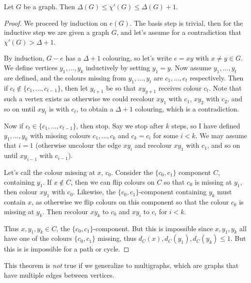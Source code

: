 \documentclass[a4paper]{scrartcl}
\begin{document}
\begin{theorem}
	Let $G$ be a graph. Then $\Delta(G) \leq \chi'(G) \leq \Delta(G) + 1$.
\end{theorem}
\begin{proof}
	We proceed by induction on $e(G)$. The basis step is trivial, then for the inductive step we are given a graph $G$, and let's assume for a contradiction that $\chi'(G) > \Delta + 1$.

	By induction, $G - e$ has a $\Delta + 1$ colouring, so let's write $e = xy$ with $x \neq y \in G$. We define vertices $y_1, \dots, y_k$ inductively by setting $y_1 = y$. Now assume $y_1, \dots, y_t$ are defined, and the colours missing from $y_1, \dots, y_t$ are $c_1, \dots, c_t$ respectively. Then if $c_t \not \in \{c_1, \dots, c_{t - 1}\}$, then let $y_{t + 1}$ be so that $xy_{y + 1}$ receives colour $c_t$.
	Note that such a vertex exists as otherwise we could recolour $xy_1$ with $c_1$, $xy_2$  with $c_2$, and so on until $x y_t$ is with $c_t$, to obtain a $\Delta + 1$ colouring, which is a  contradiction.

	Now if $c_t \in \{c_1, \dots, c_{t - 1}\}$, then stop. Say we stop after $k$ steps, so I have defined $y_1, \dots, y_k$ with missing colours $c_1, \dots, c_k$ and $c_k = c_i$ for some $i < k$. We may assume that $i = 1$ (otherwise uncolour the edge $xy_i$ and recolour $xy_1$ with $c_1$, and so on until $xy_{i - 1}$ with $c_{i - 1}$).

	Let's call the colour missing at $x$, $c_0$. Consider the $\{c_0, c_1\}$ component $C$, containing $y_1$. If $x \not \in C$, then we can flip colours on $C$ so that $c_0$ is missing at $y_1$, then colour $xy_1$ with $c_0$. Likewise, the $\{c_0, c_1\}$-component containing $y_k$ must contain $x$, as otherwise we flip colours on this component so that the colour $c_0$ is missing at $y_k$. Then recolour $xy_k$ to $c_0$ and $xy_i$ to $c_i$ for $i < k$.

	Thus $x, y_1, y_k \in C$, the $\{c_0, c_1\}$-component. But this is impossible since $x, y_1, y_k$ all have one of the colours $\{c_0, c_1\}$ missing, thus $d_C(x), d_C(y_1), d_C(y_k) \leq 1$. But this is is impossible for a path or cycle.
\end{proof}

\begin{remark}
	This theorem is \emph{not} true if we generalize to multigraphs, which are graphs that have multiple edges between vertices.
\end{remark}
\end{document}
